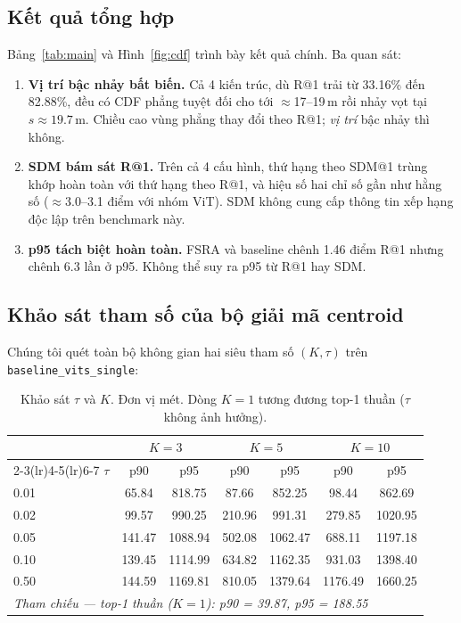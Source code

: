 \documentclass[11pt]{article}
\begin{document}
\subsection{Kết quả tổng hợp}

Bảng~\ref{tab:main} và Hình~\ref{fig:cdf} trình bày kết quả chính. Ba quan sát:
\begin{enumerate}
  \item \textbf{Vị trí bậc nhảy bất biến.} Cả 4 kiến trúc, dù R@1 trải từ 33.16\% đến 82.88\%, đều có CDF phẳng tuyệt đối cho tới $\approx$17--19\,m rồi nhảy vọt tại $s\approx19.7$\,m. Chiều cao vùng phẳng thay đổi theo R@1; \emph{vị trí} bậc nhảy thì không.
  \item \textbf{SDM bám sát R@1.} Trên cả 4 cấu hình, thứ hạng theo SDM@1 trùng khớp hoàn toàn với thứ hạng theo R@1, và hiệu số hai chỉ số gần như hằng số ($\approx$3.0--3.1 điểm với nhóm ViT). SDM không cung cấp thông tin xếp hạng độc lập trên benchmark này.
  \item \textbf{p95 tách biệt hoàn toàn.} FSRA và baseline chênh 1.46 điểm R@1 nhưng chênh 6.3 lần ở p95. Không thể suy ra p95 từ R@1 hay SDM.
\end{enumerate}

\subsection{Khảo sát tham số của bộ giải mã centroid}

Chúng tôi quét toàn bộ không gian hai siêu tham số $(K, \tau)$ trên \texttt{baseline\_vits\_single}:

\begin{table}[h]
\centering
\caption{Khảo sát $\tau$ và $K$. Đơn vị mét. Dòng $K=1$ tương đương top-1 thuần ($\tau$ không ảnh hưởng).}
\label{tab:ablation}
\begin{tabular}{lcccccc}
\toprule
& \multicolumn{2}{c}{$K=3$} & \multicolumn{2}{c}{$K=5$} & \multicolumn{2}{c}{$K=10$} \\
\cmidrule(lr){2-3}\cmidrule(lr){4-5}\cmidrule(lr){6-7}
$\tau$ & p90 & p95 & p90 & p95 & p90 & p95 \\
\midrule
0.01 & 65.84  & 818.75  & 87.66  & 852.25  & 98.44   & 862.69 \\
0.02 & 99.57  & 990.25  & 210.96 & 991.31  & 279.85  & 1020.95 \\
0.05 & 141.47 & 1088.94 & 502.08 & 1062.47 & 688.11  & 1197.18 \\
0.10 & 139.45 & 1114.99 & 634.82 & 1162.35 & 931.03  & 1398.40 \\
0.50 & 144.59 & 1169.81 & 810.05 & 1379.64 & 1176.49 & 1660.25 \\
\midrule
\multicolumn{7}{l}{\emph{Tham chiếu --- top-1 thuần ($K=1$): p90 = 39.87, p95 = 188.55}} \\
\bottomrule
\end{tabular}
\end{table}
\end{document}
